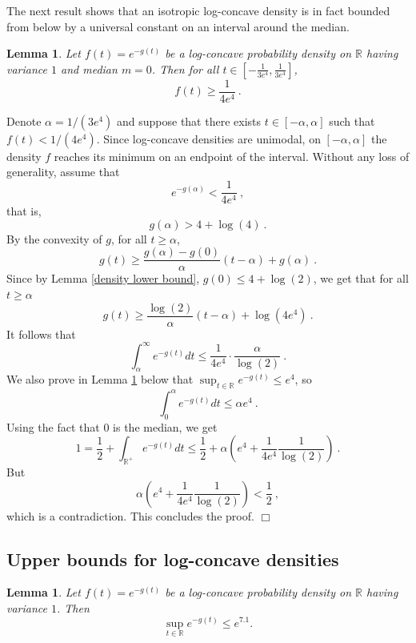 \documentclass[12pt]{article}
\newcommand{\R}{\mathbb{R}}
\newtheorem{lemma}[theorem]{Lemma}
\newcommand{\qed}{\hfill $\Box$}
\newenvironment{proof}{\par\noindent{\bf Proof:}}{\qed \par\medskip\noindent}
\begin{document}
The next result shows that an isotropic log-concave density
is in fact bounded from below by a universal constant on an interval
around the median.





\begin{lemma}
\label{density lower bound bis}
Let $f(t) = e^{-g(t)}$ be a log-concave probability density on $\R$
having variance $1$ and median $m=0$. Then 
for all $t\in \left[-\frac{1}{3e^4},\frac{1}{3e^4}\right]$,
\[
  f(t) \geq \frac{1}{4e^4}~.
\]  
\end{lemma}




\begin{proof}
Denote $\alpha=1/(3e^4)$ and suppose that there exists $t\in\left[
  -\alpha,\alpha\right]$
such that $f(t)< 1/(4e^4)$.
Since log-concave densities are  unimodal, on $\left[
  -\alpha,\alpha\right]$
the density $f$ reaches its minimum on an endpoint of the
interval.
Without any loss of generality, assume that
$$ e^{-g(\alpha)} < \frac{1}{4e^4}~,$$
that is,
$$g(\alpha) > 4+\log(4)~.$$
By the convexity of $g$,
for all $t \geq \alpha$,
\[
  g(t)\geq  \frac{g(\alpha)-g(0)}{\alpha}(t-\alpha)+g(\alpha)~.
\]
Since by Lemma \ref{density lower bound},  $g(0)\leq4+\log(2)$, we get  that
for all $t \geq \alpha$
\[
  g(t)\geq \frac{\log(2)}{\alpha}(t-\alpha)+\log(4e^4)~.
\]
It follows that
$$
\int_{\alpha}^\infty e^{-g(t)}dt \leq \frac{1}{4e^4}  \cdot \frac{\alpha}{\log(2)}~. $$
We also prove in Lemma \ref{density upper bound} below that $\sup_{t\in\R}e^{-g(t)}\leq e^4$, so
$$ \int_0^\alpha e^{-g(t)}dt \leq \alpha e^4~. $$
Using the fact that $0$ is the median, we get
\[
  1=\frac{1}{2}+\int_{\R^+}e^{-g(t)}dt \leq \frac{1}{2}+ \alpha\left(
    e^4+\frac{1}{4e^4} \frac{1}{\log(2)} \right)~.
\]  
But
$$ \alpha\left( e^4+\frac{1}{4e^4} \frac{1}{\log(2)} \right)<\frac{1}{2}~, $$
which is a contradiction. This concludes the proof.
\end{proof}




\subsection{Upper bounds for log-concave densities}



\begin{lemma}
  \label{density upper bound}
Let $f(t) = e^{-g(t)}$ be a log-concave probability density on $\R$
having variance $1$. Then
$$ \sup_{t\in\R}e^{-g(t)}\leq e^{7.1}. $$
\end{lemma}
\end{document}
